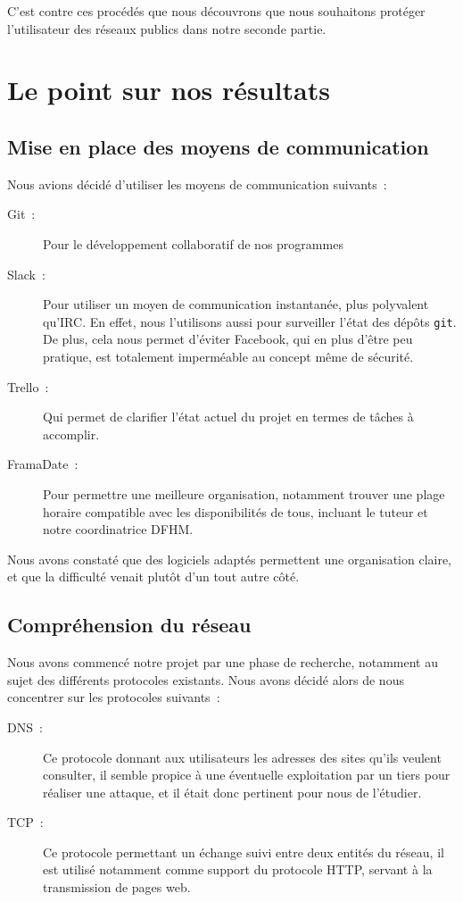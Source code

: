 \documentclass[a4paper, 12pt,twoside]{article}
\begin{document}
    C'est contre ces procédés que nous découvrons que nous souhaitons protéger l'utilisateur des réseaux publics dans notre seconde partie.

\clearpage
\section{Le point sur nos résultats}

    \subsection{Mise en place des moyens de communication}

    Nous avions décidé d'utiliser les moyens de communication suivants~:
    \begin{description}
        \item[Git~:] Pour le développement collaboratif de nos programmes
        \item[Slack~:] Pour utiliser un moyen de communication instantanée, plus polyvalent qu'IRC. En effet, nous l'utilisons aussi pour surveiller l'état des dépôts \verb!git!. De plus, cela nous permet d'éviter Facebook, qui en plus d'être peu pratique, est totalement imperméable au concept même de sécurité.
        \item[Trello~:] Qui permet de clarifier l'état actuel du projet en termes de tâches à accomplir.
        \item[FramaDate~:] Pour permettre une meilleure organisation, notamment trouver une plage horaire compatible avec les disponibilités de tous, incluant le tuteur et notre coordinatrice DFHM.
    \end{description}

    Nous avons constaté que des logiciels adaptés permettent une organisation claire, et que la difficulté venait plutôt d'un tout autre côté.

    \subsection{Compréhension du réseau}

    Nous avons commencé notre projet par une phase de recherche,  notamment au sujet des différents protocoles existants. Nous avons décidé alors de nous concentrer sur les protocoles suivants~:
    \begin{description}
        \item[DNS~:] Ce protocole donnant aux utilisateurs les adresses des sites qu'ils veulent consulter, il semble propice à une éventuelle exploitation par un tiers pour réaliser une attaque, et il était donc pertinent pour nous de l'étudier.
        \item[TCP~:] Ce protocole permettant un échange suivi entre deux entités du réseau, il est utilisé notamment comme support du protocole HTTP, servant à la transmission de pages web.
    \end{description}
\end{document}
